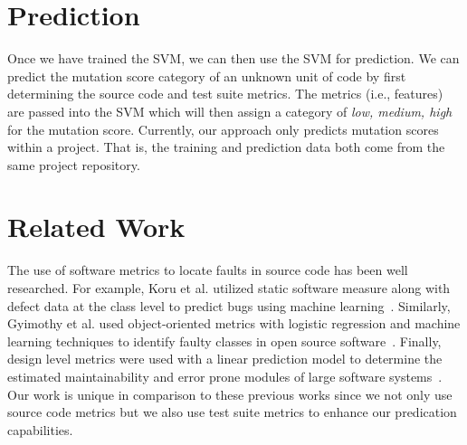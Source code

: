 \section{Prediction}
\label{sec:approach_prediction}
Once we have trained the SVM, we can then use the SVM for prediction. We can predict the mutation score category of an unknown unit of code by first determining the source code and test suite metrics. The metrics (i.e., features) are passed into the SVM which will then assign a category of \textit{low, medium, high} for the mutation score.  Currently, our approach only predicts mutation scores within a project. That is, the training and prediction data both come from the same project repository.


\section{Related Work}
\label{sec:approach_related_work}
The use of software metrics to locate faults in source code has been well researched. For example, Koru et al. utilized static software measure along with defect data at the class level to predict bugs using machine learning~\cite{KL05}. Similarly, Gyimothy et al. used object-oriented metrics with logistic regression and machine learning techniques to identify faulty classes in open source software~\cite{GFS05}. Finally, design level metrics were used with a linear prediction model to determine the estimated maintainability and error prone modules of large software systems~\cite{MKPS00}. Our work is unique in comparison to these previous works since we not only use source code metrics but we also use test suite metrics to enhance our predication capabilities.

